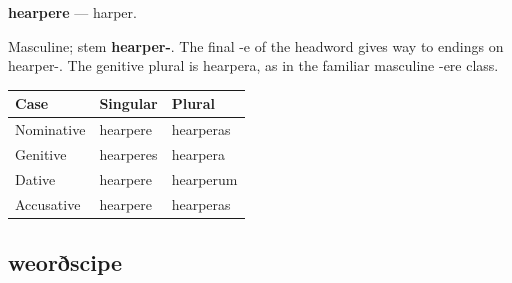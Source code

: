 \par\begin{minipage}{\linewidth}\raggedright
\textbf{hearpere} — harper.

Masculine; stem \textbf{hearper-}. The final -e of the headword gives way to endings on hearper-. The genitive plural is hearpera, as in the familiar masculine -ere class.

\par\begingroup
\fontsize{10.5}{13.2}\selectfont
\setlength{\LTleft}{0pt}\setlength{\LTright}{\fill}
\noindent
\begin{tabular}{@{}>{\raggedright\arraybackslash}p{39.46mm}>{\raggedright\arraybackslash}p{39.46mm}>{\raggedright\arraybackslash}p{39.46mm}@{}}
\toprule
\textbf{Case} & \textbf{Singular} & \textbf{Plural} \\
\midrule
Nominative & hearpere & hearperas \\
Genitive & hearperes & hearpera \\
Dative & hearpere & hearperum \\
Accusative & hearpere & hearperas \\
\bottomrule
\end{tabular}
\par\endgroup

\end{minipage}\par
{}
\subsection*{weorðscipe}

